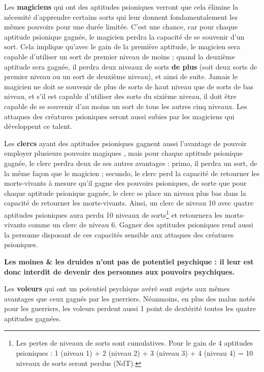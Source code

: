 \documentclass[11pt]{article}
\begin{document}
{\bigskip

Les \textbf{magiciens} qui ont des aptitudes psioniques verront que cela élimine la nécessité d'apprendre certains sorts qui leur donnent fondamentalement les mêmes pouvoirs pour une durée limitée. C'est une chance, car pour chaque aptitude psionique gagnée, le magicien perdra la capacité de se souvenir d'un sort. Cela implique qu'avec le gain de la première aptitude, le magicien sera capable d'utiliser un sort de premier niveau de moins ; quand la deuxième aptitude sera gagnée, il perdra deux niveaux de sorts \textbf{de plus} (soit deux sorts de premier niveau ou un sort de deuxième niveau), et ainsi de suite. Jamais le magicien ne doit se souvenir de plus de sorts de haut niveau que de sorts de bas niveau, et s'il est capable d'utiliser des sorts du sixième niveau, il doit être capable de se souvenir d'au moins un sort de tous les autres cinq niveaux. Les attaques des créatures psioniques seront aussi subies par les magiciens qui développent ce talent.

\bigskip

Les \textbf{clercs} ayant des aptitudes psioniques gagnent aussi l'avantage de pouvoir employer plusieurs pouvoirs \og magiques \fg{}, mais pour chaque aptitude psionique gagnée, le clerc perdra deux de ses autres avantages : primo, il perdra un sort, de la même façon que le magicien ; secundo, le clerc perd la capacité de retourner les morts-vivants à mesure qu'il gagne des pouvoirs  psioniques, de sorte que pour chaque aptitude psionique gagnée, le clerc se place un niveau plus bas dans la capacité de retourner les morts-vivants. Ainsi, un clerc de niveau 10 avec quatre aptitudes psioniques aura perdu 10 niveaux de sorts\footnote{Les pertes de niveaux de sorts sont cumulatives. Pour le gain de 4 aptitudes psioniques : 1 (niveau 1) + 2 (niveau 2) + 3 (niveau 3) + 4 (niveau 4) = 10 niveaux de sorts seront perdus (NdT).} et retournera les morts-vivants comme un clerc de niveau 6. Gagner des aptitudes psioniques rend aussi la personne disposant de ces capacités sensible aux attaques des créatures psioniques.

\bigskip

\textbf{Les moines \& les druides n'ont pas de potentiel psychique : il leur est donc interdit de devenir des personnes aux pouvoirs psychiques.}

\bigskip

Les \textbf{voleurs} qui ont un potentiel psychique avéré sont sujets aux mêmes avantages que ceux gagnés par les guerriers. Néanmoins, en plus des malus notés pour les guerriers, les voleurs perdent aussi 1 point de dextérité toutes les quatre aptitudes gagnées.

}
\end{document}
